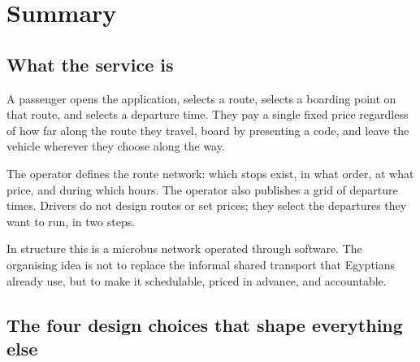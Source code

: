 \chapter{Summary}


\section{What the service is}

A passenger opens the application, selects a route, selects a boarding point on that route, and
selects a departure time. They pay a single fixed price regardless of how far along the route they
travel, board by presenting a code, and leave the vehicle wherever they choose along the way.

The operator defines the route network: which stops exist, in what order, at what price, and during
which hours. The operator also publishes a grid of departure times. Drivers do not design routes or
set prices; they select the departures they want to run, in two steps.

In structure this is a microbus network operated through software. The organising idea is not to
replace the informal shared transport that Egyptians already use, but to make it schedulable,
priced in advance, and accountable.

\section{The four design choices that shape everything else}

